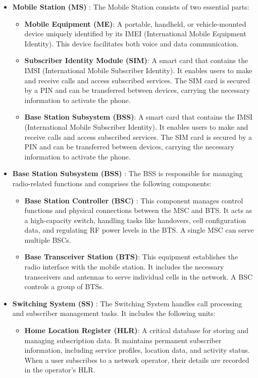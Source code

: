 \documentclass[conference]{IEEEtran}
\begin{document}
\begin{itemize}
    \item \textbf{Mobile Station (MS)} : The Mobile Station consists of two essential parts:
    \begin{itemize}
        \item \textbf{Mobile Equipment (ME)}: A portable, handheld, or vehicle-mounted device uniquely identified by its IMEI (International Mobile Equipment Identity). This device facilitates both voice and data communication.
        \item \textbf{Subscriber Identity Module (SIM)}: A smart card that contains the IMSI (International Mobile Subscriber Identity). It enables users to make and receive calls and access subscribed services. The SIM card is secured by a PIN and can be transferred between devices, carrying the necessary information to activate the phone.
        \item \textbf{Base Station Subsystem (BSS)}: A smart card that contains the IMSI (International Mobile Subscriber Identity). It enables users to make and receive calls and access subscribed services. The SIM card is secured by a PIN and can be transferred between devices, carrying the necessary information to activate the phone.
    \end{itemize}

    \item \textbf{Base Station Subsystem (BSS)} : The BSS is responsible for managing radio-related functions and comprises the following components:
    \begin{itemize}
        \item \textbf{Base Station Controller (BSC)} : This component manages control functions and physical connections between the MSC and BTS. It acts as a high-capacity switch, handling tasks like handovers, cell configuration data, and regulating RF power levels in the BTS. A single MSC can serve multiple BSCs.

        \item \textbf{Base Transceiver Station (BTS)}: This equipment establishes the radio interface with the mobile station. It includes the necessary transceivers and antennas to serve individual cells in the network. A BSC controls a group of BTSs.        
    \end{itemize}

    \item \textbf{Switching System (SS)} : The Switching System handles call processing and subscriber management tasks. It includes the following units:
    \begin{itemize}
        \item \textbf{Home Location Register (HLR)}: A critical database for storing and managing subscription data. It maintains permanent subscriber information, including service profiles, location data, and activity status. When a user subscribes to a network operator, their details are recorded in the operator's HLR.


\end{itemize}
\end{itemize}
\end{document}
